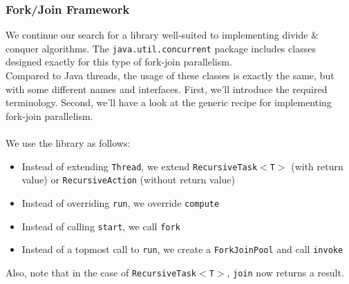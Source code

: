 \documentclass[main.tex]{subfiles}
\begin{document}
\subsubsection{Fork/Join Framework}
We continue our search for a library well-suited to implementing divide \& conquer algorithms. The \texttt{java.util.concurrent} package includes classes designed exactly for this type of fork-join parallelism.\\
Compared to Java threads, the usage of these classes is exactly the same, but with some different names and interfaces. First, we'll introduce the required terminology. Second, we'll have a look at the generic recipe for implementing fork-join parallelism.\\
\\
We use the library as follows:
\begin{itemize}
    \item Instead of extending \texttt{Thread}, we extend \texttt{RecursiveTask$<$T$>$} (with return value) or \texttt{RecursiveAction} (without return value)
    \item Instead of overriding \texttt{run}, we override \texttt{compute}
    \item Instead of calling \texttt{start}, we call \texttt{fork}
    \item Instead of a topmost call to \texttt{run}, we create a \texttt{ForkJoinPool} and call \texttt{invoke}
\end{itemize}
Also, note that in the case of \texttt{RecursiveTask$<$T$>$}, \texttt{join} now returns a result.\\
\end{document}
